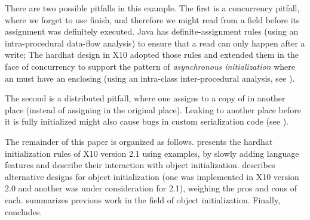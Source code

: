There are two possible pitfalls in this example.
The first is a concurrency pitfall, where we forget to use finish,
    and therefore we might read from a field before its assignment was definitely executed.
Java has definite-assignment rules (using an intra-procedural data-flow analysis)
    to ensure that a read can only happen after a write;
    The hardhat design in X10 adopted those rules
        and extended them in the face of concurrency to support the pattern of
            \emph{asynchronous initialization}
            where an  must have an enclosing 
    (using an intra-class inter-procedural analysis, see ).

The second is a distributed pitfall, where
    one assigns to a copy of \this in another place (instead of assigning in the original place).
Leaking \this to another place before it is fully initialized
    might also cause bugs in custom serialization code (see ).



The remainder of this paper is organized as follows.
 presents the hardhat initialization rules of X10 version 2.1
    using examples,
    by slowly adding language features and describe their interaction with
    object initialization.
 describes alternative designs for object initialization
    (one was implemented in X10 version 2.0 and another was under consideration for 2.1),
    weighing the pros and cons of each.
 summarizes previous work in the field of object initialization.
Finally,  concludes.

